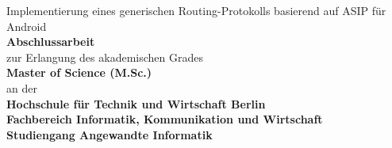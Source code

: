 \begin{center}
    \LARGE
    Implementierung eines generischen Routing-Protokolls basierend auf ASIP für Android\\
    \vspace*{1.5cm}
    \Large
    \textbf{Abschlussarbeit}\\
    \vspace*{1.5cm}
    \large
    zur Erlangung des akademischen Grades\\
    \vspace*{1cm}
    \Large
    \textbf{Master of Science (M.Sc.)}\\
    \vspace*{1.5cm}
    \large
    an der\\
    \vspace*{1.5cm}
    \large
    \textbf{Hochschule für Technik und Wirtschaft Berlin}\\
    \textbf{Fachbereich Informatik, Kommunikation und Wirtschaft}\\
    \textbf{Studiengang Angewandte Informatik}\\

\end{center}
